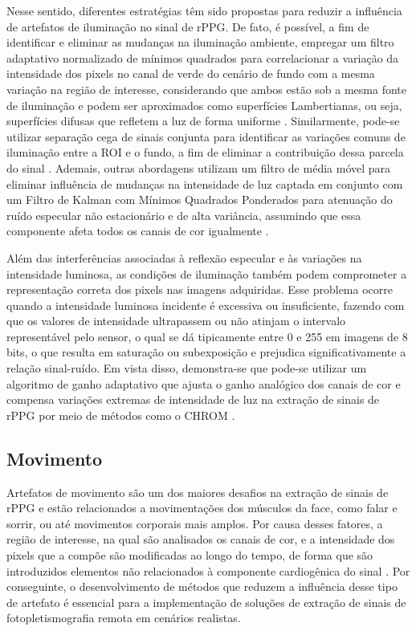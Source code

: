Nesse sentido, diferentes estratégias têm sido propostas para reduzir a influência de artefatos de iluminação no sinal de rPPG. De fato, é possível, a fim de identificar e eliminar as mudanças na iluminação ambiente, empregar um filtro adaptativo normalizado de mínimos quadrados para correlacionar a variação da intensidade dos pixels no canal de verde do cenário de fundo com a mesma variação na região de interesse, considerando que ambos estão sob a mesma fonte de iluminação e podem ser aproximados como superfícies Lambertianas, ou seja, superfícies difusas que refletem a luz de forma uniforme \cite{li2014remote}. Similarmente, pode-se utilizar separação cega de sinais conjunta para identificar as variações comuns de iluminação entre a ROI e o fundo, a fim de eliminar a contribuição dessa parcela do sinal \cite{cheng2016illumination}. Ademais, outras abordagens utilizam um filtro de média móvel para eliminar influência de mudanças na intensidade de luz captada em conjunto com um Filtro de Kalman com Mínimos Quadrados Ponderados para atenuação do ruído especular não estacionário e de alta variância, assumindo que essa componente afeta todos os canais de cor igualmente \cite{li2025improving}.

Além das interferências associadas à reflexão especular e às variações na intensidade luminosa, as condições de iluminação também podem comprometer a representação correta dos pixels nas imagens adquiridas. Esse problema ocorre quando a intensidade luminosa incidente é excessiva ou insuficiente, fazendo com que os valores de intensidade ultrapassem ou não atinjam o intervalo representável pelo sensor, o qual se dá tipicamente entre 0 e 255 em imagens de 8 bits, o que resulta em saturação ou subexposição e prejudica significativamente a relação sinal-ruído. Em vista disso, demonstra-se que pode-se utilizar um algoritmo de ganho adaptativo que ajusta o ganho analógico dos canais de cor e compensa variações extremas de intensidade de luz na extração de sinais de rPPG por meio de métodos como o CHROM \cite{papageorgiou2014adaptive}.

 
\subsection{Movimento}

Artefatos de movimento são um dos maiores desafios na extração de sinais de rPPG e estão relacionados a movimentações dos músculos da face, como falar e sorrir, ou até movimentos corporais mais amplos. Por causa desses fatores, a região de interesse, na qual são analisados os canais de cor, e a intensidade dos pixels que a compõe são modificadas ao longo do tempo, de forma que são introduzidos elementos não relacionados à componente cardiogênica do sinal \cite{hassan2017effect}. Por conseguinte, o desenvolvimento de métodos que reduzem a influência desse tipo de artefato é essencial para a implementação de soluções de extração de sinais de fotopletismografia remota em cenários realistas. 

